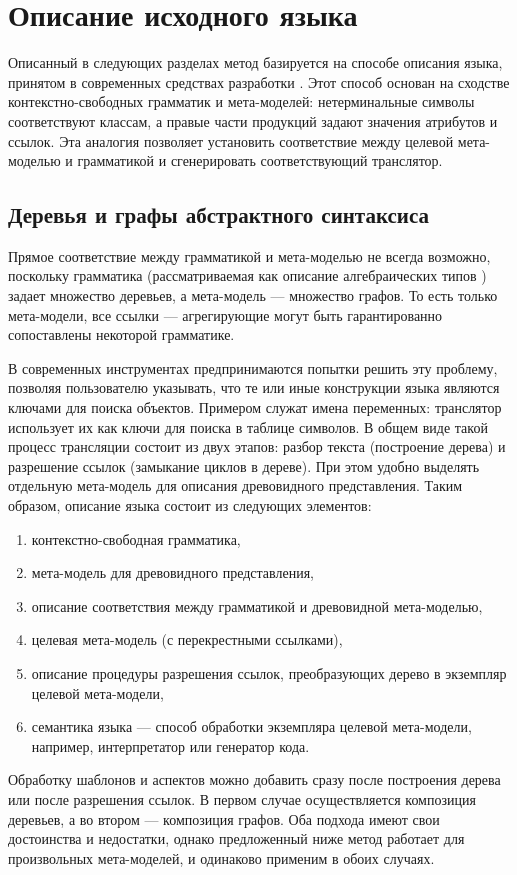 \chapter{Описание исходного языка}

Описанный в следующих разделах метод базируется на способе описания языка, принятом в современных средствах разработки \cite{xText}. Этот способ основан на сходстве контекстно-свободных грамматик и мета-моделей: нетерминальные символы соответствуют классам, а правые части продукций задают значения атрибутов и ссылок. Эта аналогия позволяет установить соответствие между целевой мета-моделью и грамматикой и сгенерировать соответствующий транслятор.

\section{Деревья и графы абстрактного синтаксиса}

Прямое соответствие между грамматикой и мета-моделью не всегда возможно, поскольку грамматика (рассматриваемая как описание алгебраических типов \cite{?}) задает множество деревьев, а мета-модель --- множество графов. То есть только мета-модели, все ссылки --- агрегирующие могут быть гарантированно сопоставлены некоторой грамматике.

В современных инструментах предпринимаются попытки решить эту проблему, позволяя пользователю указывать, что те или иные конструкции языка являются ключами для поиска объектов. Примером служат имена переменных: транслятор использует их как ключи для поиска в таблице символов. В общем виде такой процесс трансляции состоит из двух этапов: разбор текста (построение дерева) и разрешение ссылок (замыкание циклов в дереве).
При этом удобно выделять отдельную мета-модель для описания древовидного представления. Таким образом, описание языка состоит из следующих элементов:
\begin{enumerate}
\item контекстно-свободная грамматика,
\item мета-модель для древовидного представления,
\item описание соответствия между грамматикой и древовидной мета-моделью,
\item целевая мета-модель (с перекрестными ссылками),
\item описание процедуры разрешения ссылок, преобразующих дерево в экземпляр целевой мета-модели,
\item семантика языка --- способ обработки экземпляра целевой мета-модели, например, интерпретатор или генератор кода.
\end{enumerate}

Обработку шаблонов и аспектов можно добавить сразу после построения дерева или после разрешения ссылок. В первом случае осуществляется композиция деревьев, а во втором --- композиция графов. Оба подхода имеют свои достоинства и недостатки, однако предложенный ниже метод работает для произвольных мета-моделей, и одинаково применим в обоих случаях.



